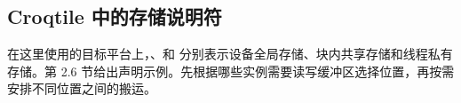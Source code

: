 \subsection*{Croqtile 中的存储说明符}

在这里使用的目标平台上，\co@global@、\co@shared@ 和 \co@local@ 分别表示设备全局存储、块内共享存储和线程私有存储。第 2.6 节给出声明示例。先根据哪些实例需要读写缓冲区选择位置，再按需安排不同位置之间的搬运。
